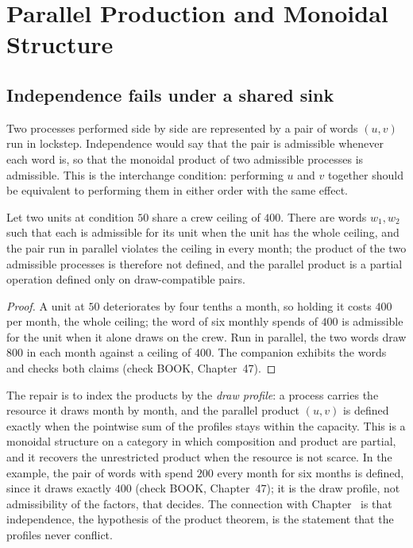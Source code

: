 \chapter{Parallel Production and Monoidal Structure}\label{ch:47}

\section{Independence fails under a shared sink}

Two processes performed side by side are represented by a pair of words $(u,v)$ run in lockstep. Independence would say that the pair is admissible whenever each word is, so that the monoidal product of two admissible processes is admissible. This is the interchange condition: performing $u$ and $v$ together should be equivalent to performing them in either order with the same effect.

\begin{proposition}\label{prop:interchange}
Let two units at condition $50$ share a crew ceiling of $400$. There are words $w_1,w_2$ such that each is admissible for its unit when the unit has the whole ceiling, and the pair run in parallel violates the ceiling in every month; the product of the two admissible processes is therefore not defined, and the parallel product is a partial operation defined only on draw-compatible pairs.
\end{proposition}

\begin{proof}
A unit at $50$ deteriorates by four tenths a month, so holding it costs $400$ per month, the whole ceiling; the word of six monthly spends of $400$ is admissible for the unit when it alone draws on the crew. Run in parallel, the two words draw $800$ in each month against a ceiling of $400$. The companion exhibits the words and checks both claims (check BOOK, Chapter~47).
\end{proof}

The repair is to index the products by the \emph{draw profile}: a process carries the resource it draws month by month, and the parallel product $(u,v)$ is defined exactly when the pointwise sum of the profiles stays within the capacity. This is a monoidal structure on a category in which composition and product are partial, and it recovers the unrestricted product when the resource is not scarce. In the example, the pair of words with spend $200$ every month for six months is defined, since it draws exactly $400$ (check BOOK, Chapter~47); it is the draw profile, not admissibility of the factors, that decides. The connection with Chapter~ is that independence, the hypothesis of the product theorem, is the statement that the profiles never conflict.

